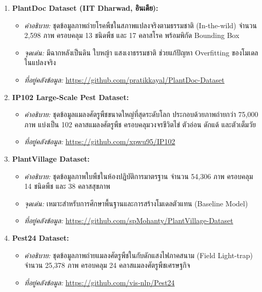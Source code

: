 \begin{enumerate}
    \item \textbf{PlantDoc Dataset (IIT Dharwad, อินเดีย):}
    \begin{itemize}
        \item \textit{คำอธิบาย:} ชุดข้อมูลภาพถ่ายโรคพืชในสภาพแปลงจริงตามธรรมชาติ (In-the-wild) จำนวน 2,598 ภาพ ครอบคลุม 13 ชนิดพืช และ 17 คลาสโรค พร้อมพิกัด Bounding Box
        \item \textit{จุดเด่น:} มีฉากหลังเป็นดิน ใบหญ้า แสงเงาธรรมชาติ ช่วยแก้ปัญหา Overfitting ของโมเดลในแปลงจริง
        \item \textit{ที่อยู่คลังข้อมูล:} \url{https://github.com/pratikkayal/PlantDoc-Dataset}
    \end{itemize}

    \item \textbf{IP102 Large-Scale Pest Dataset:}
    \begin{itemize}
        \item \textit{คำอธิบาย:} ชุดข้อมูลแมลงศัตรูพืชขนาดใหญ่ที่สุดระดับโลก ประกอบด้วยภาพถ่ายกว่า 75,000 ภาพ แบ่งเป็น 102 คลาสแมลงศัตรูพืช ครอบคลุมวงจรชีวิตไข่ ตัวอ่อน ดักแด้ และตัวเต็มวัย
        \item \textit{ที่อยู่คลังข้อมูล:} \url{https://github.com/xpwu95/IP102}
    \end{itemize}

    \item \textbf{PlantVillage Dataset:}
    \begin{itemize}
        \item \textit{คำอธิบาย:} ชุดข้อมูลภาพใบพืชในห้องปฏิบัติการมาตรฐาน จำนวน 54,306 ภาพ ครอบคลุม 14 ชนิดพืช และ 38 คลาสสุขภาพ
        \item \textit{จุดเด่น:} เหมาะสำหรับการศึกษาพื้นฐานและการสร้างโมเดลตัวแทน (Baseline Model)
        \item \textit{ที่อยู่คลังข้อมูล:} \url{https://github.com/spMohanty/PlantVillage-Dataset}
    \end{itemize}

    \item \textbf{Pest24 Dataset:}
    \begin{itemize}
        \item \textit{คำอธิบาย:} ชุดข้อมูลภาพถ่ายแมลงศัตรูพืชในกับดักแสงไฟภาคสนาม (Field Light-trap) จำนวน 25,378 ภาพ ครอบคลุม 24 คลาสแมลงศัตรูพืชเศรษฐกิจ
        \item \textit{ที่อยู่คลังข้อมูล:} \url{https://github.com/vis-nlp/Pest24}
    \end{itemize}
\end{enumerate}

